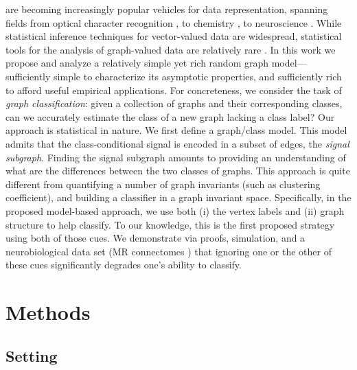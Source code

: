 \documentclass[10pt,journal,cspaper,compsoc]{IEEEtran}
\begin{document}
 are becoming increasingly popular vehicles for data representation, spanning fields from optical character recognition \cite{}, to chemistry \cite{}, to neuroscience \cite{}.  While statistical inference techniques for vector-valued data are widespread, statistical tools for the analysis of graph-valued data are relatively rare \cite{}. In this work we propose and analyze a relatively simple yet rich random graph model---sufficiently simple to characterize its asymptotic properties, and sufficiently rich to afford useful empirical applications.  For concreteness, we consider the task of \emph{graph classification}: given a collection of graphs and their corresponding classes, can we accurately estimate the class of a new graph lacking a class label?  Our approach is statistical in nature. We first define a graph/class model.  This model admits that the class-conditional signal is encoded in a subset of edges, the \emph{signal subgraph}. Finding the signal subgraph amounts to providing an understanding of what are the differences between the two classes of graphs.  This approach is quite different from quantifying a number of graph invariants (such as clustering coefficient), and building a classifier in a graph invariant space.  Specifically, in the proposed model-based approach, we use both (i) the vertex labels and (ii) graph structure to help classify.  To our knowledge, this is the first proposed strategy using both of those cues.  We demonstrate via proofs, simulation, and a neurobiological data set (MR connectomes \cite{}) that ignoring one or the other of these cues significantly degrades one's ability to classify.

\section{Methods} %
\label{sec:methods}


\subsection{Setting}
\end{document}
